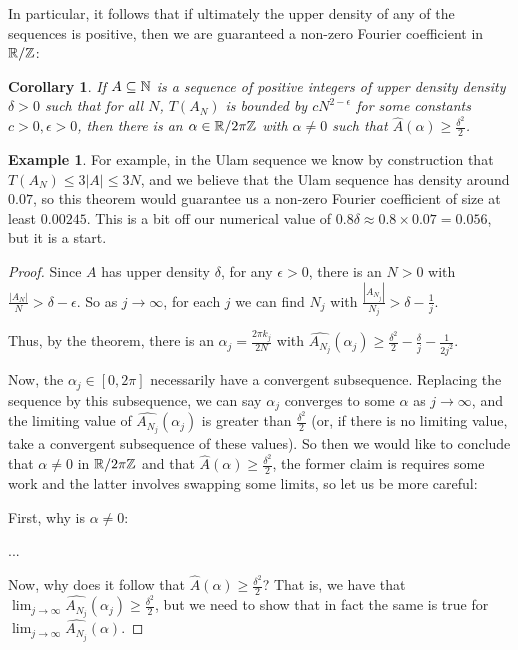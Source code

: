 \documentclass{article}
\newtheorem{corollary}{Corollary}[theorem]
\theoremstyle{definition}
\newtheorem{example}{Example}
\theoremstyle{remark}
\numberwithin{equation}{section}
\begin{document}
In particular, it follows that if ultimately the upper density of any
of the \relevant sequences is positive, then we are guaranteed a
non-zero Fourier coefficient in $\mathbb{R}/\mathbb{Z}$:
{\color{red}
\begin{corollary}\label{thm:alpha}
  If $A \subseteq \mathbb{N}$ is a sequence of positive integers of upper
  density density $\delta > 0$ such that for all $N$, $T(A_N)$ is
  bounded by $c N^{2-\epsilon}$ for some constants
  $c > 0, \epsilon > 0$, then there is an $\alpha \in \mathbb{R}/2\pi\mathbb{Z}$ with
  $\alpha \neq 0$ such that
  $\widehat{A}(\alpha) \geq \frac{\delta^2}{2}$.
\end{corollary}

\begin{example}
  For example, in the Ulam sequence we know by construction that
  $T(A_N) \leq 3|A| \leq 3N$, and we believe that the Ulam sequence
  has density around $0.07$, so this theorem would guarantee us a
  non-zero Fourier coefficient of size at least $0.00245$.  This is a
  bit off our numerical value of
  $0.8\delta \approx 0.8 \times 0.07 = 0.056$, but it is a start.
\end{example}

\begin{proof}Since $A$ has upper density $\delta$, for any
  $\epsilon > 0$, there is an $N > 0$ with
  $\frac{|A_N|}{N} > \delta-\epsilon$.  So as $j \to \infty$, for each
  $j$ we can find $N_j$ with
  $\frac{|A_{N_j}|}{N_j} > \delta-\frac{1}{j}$.

  Thus, by the theorem, there is an $\alpha_j = \frac{2\pi k_j}{2N}$
  with
  $\widehat{A_{N_j}}(\alpha_j) \geq
  \frac{\delta^2}{2}-\frac{\delta}{j} - \frac{1}{2j^2}$.

  Now, the $\alpha_j \in [0,2\pi]$ necessarily have a convergent
  subsequence.  Replacing the sequence by this subsequence, we can say
  $\alpha_j$ converges to some $\alpha$ as $j \to \infty$, and the
  limiting value of $\widehat{A_{N_j}}(\alpha_j)$ is greater than
  $\frac{\delta^2}{2}$ (or, if there is no limiting value, take a
  convergent subsequence of these values).  So then we would like to
  conclude that $\alpha \neq 0$ in $\mathbb{R}/2\pi\mathbb{Z}$ and that
  $\widehat{A}(\alpha) \geq \frac{\delta^2}{2}$, the former claim is
  requires some work and the latter involves swapping some limits, so
  let us be more careful:

  First, why is $\alpha \neq 0$: 

  ...

  Now, why does it follow that
  $\widehat{A}(\alpha) \geq \frac{\delta^2}{2}$?  That is, we have
  that
  $\lim_{j \to \infty} \widehat{A_{N_j}}(\alpha_j) \geq
  \frac{\delta^2}{2}$, but we need to show that in fact the same is
  true for $\lim_{j \to \infty} \widehat{A_{N_j}}(\alpha)$.


\end{proof}}
\end{document}

